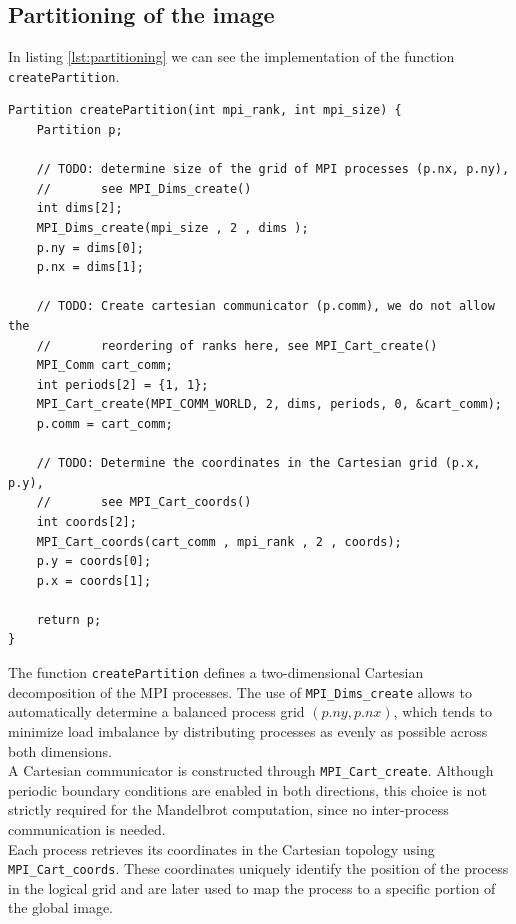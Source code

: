 \documentclass[unicode,10pt,a4paper,oneside,numbers=endperiod,openany]{scrartcl}
\begin{document}
\subsection{Partitioning of the image}
In listing \ref{lst:partitioning} we can see the implementation of the function \texttt{createPartition}.\\

\begin{lstlisting}[style=grayverbatim, caption={Partitioning of the image}, label={lst:partitioning}]
Partition createPartition(int mpi_rank, int mpi_size) {
    Partition p;

    // TODO: determine size of the grid of MPI processes (p.nx, p.ny),
    //       see MPI_Dims_create()
    int dims[2];
    MPI_Dims_create(mpi_size , 2 , dims );
    p.ny = dims[0];
    p.nx = dims[1];

    // TODO: Create cartesian communicator (p.comm), we do not allow the
    //       reordering of ranks here, see MPI_Cart_create()
    MPI_Comm cart_comm;
    int periods[2] = {1, 1};
    MPI_Cart_create(MPI_COMM_WORLD, 2, dims, periods, 0, &cart_comm);
    p.comm = cart_comm;
    
    // TODO: Determine the coordinates in the Cartesian grid (p.x, p.y),
    //       see MPI_Cart_coords()
    int coords[2];
    MPI_Cart_coords(cart_comm , mpi_rank , 2 , coords);
    p.y = coords[0];
    p.x = coords[1];

    return p;
}
\end{lstlisting}

The function \texttt{createPartition} defines a two-dimensional Cartesian decomposition of the MPI processes. The use of \texttt{MPI\_Dims\_create} allows to automatically determine a balanced process grid \((p.ny, p.nx)\), which tends to minimize load imbalance by distributing processes as evenly as possible across both dimensions.\\
A Cartesian communicator is constructed through \texttt{MPI\_Cart\_create}. Although periodic boundary conditions are enabled in both directions, this choice is not strictly required for the Mandelbrot computation, since no inter-process communication is needed.\\
Each process retrieves its coordinates in the Cartesian topology using \texttt{MPI\_Cart\_coords}. These coordinates uniquely identify the position of the process in the logical grid and are later used to map the process to a specific portion of the global image.\\
\end{document}
